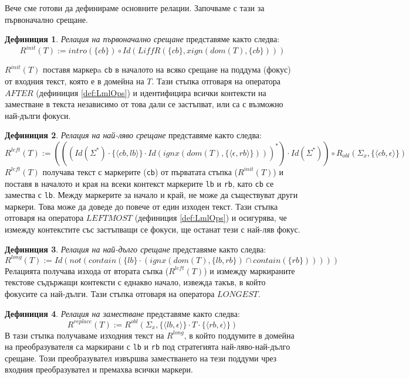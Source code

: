 \documentclass[12pt, oneside]{article}
\theoremstyle{definition}
\newtheorem{definition}{Дефиниция}[section]
\begin{document}
Вече сме готови да дефинираме основните релации. Започваме с тази за първоначално срещане.

\begin{definition}\label{def:Rinit} \emph{Релация на първоначално срещане} представяме както следва:
	\[ R^{init}(T) := intro(\{ cb \}) \circ Id(LiffR(\{ cb \}, xign(dom(T), \{ cb \}))) \]

	\( R^{init}(T) \) поставя маркерa \verb/cb/ в началото на всяко срещане на поддума (фокус) от входния текст, която е в домейна на \(T\). Тази стъпка отговаря на оператора \(AFTER\) (дефиниция \ref{def:LmlOps}) и идентифицира всички контексти на заместване в текста независимо от това дали се застъпват, или са с възможно най-дълги фокуси. 
\end{definition}

\begin{definition}\label{def:Rleft} \emph{Релация на най-ляво срещане} представяме както следва:
	\[ R^{left}(T) := (((Id(\Sigma^*) \cdot \{ \langle cb, lb \rangle \} \cdot Id(ignx(dom(T), \{ \langle \epsilon, rb \rangle \})))^*) \cdot Id(\Sigma^*)) \circ R_{obl} (\Sigma_x, \{ \langle cb, \epsilon \rangle \}) \]
	\(R^{left}(T)\) получава текст с маркерите (\verb/cb/) от първатата стъпка (\(R^{init}(T)\)) и поставя в началото и края на всеки контекст маркерите \verb/lb/ и \verb/rb/, като  \verb/cb/ се замества с \verb/lb/. Между маркерите за начало и край, не може да съществуват други маркери. Това може да доведе до повече от един изходен текст. Тази стъпка отговаря на оператора \(LEFTMOST\) (дефиниция \ref{def:LmlOps}) и осигурява, че измежду контекстите със застъпващи се фокуси, ще останат тези с най-ляв фокус.
\end{definition}

\begin{definition}\label{def:Rlong} \emph{Релация на най-дълго срещане} представяме както следва:
	\[ R^{long}(T) := Id(not(contain(\{lb\} \cdot (ignx(dom(T), \{lb, rb\}) \cap contain(\{rb\}))))) \]
	Релацията получава изхода от втората съпка (\(R^{left}(T)\)) и измежду маркираните текстове съдържащи контексти с еднакво начало, извежда такъв, в който фокусите са най-дълги. Тази стъпка отговаря на оператора \(LONGEST\).
\end{definition}

\begin{definition}\label{def:Rreplace} \emph{Релация на заместване} представяме както следва:
	\[ R^{replace}(T) := R^{obl}(\Sigma_x, \{ \langle lb, \epsilon \rangle \} \cdot T \cdot \{ \langle rb, \epsilon \rangle \}) \]
	В тази стъпка получаваме изходния текст на \(R^{long}\), в който поддумите в домейна на преобразувателя са маркирани с \verb/lb/ и \verb/rb/ под стратегията най-ляво-най-дълго срещане. Този преобразувател извършва заместването на тези поддуми чрез входния преобразувател и премахва всички маркери.
\end{definition}
\end{document}
